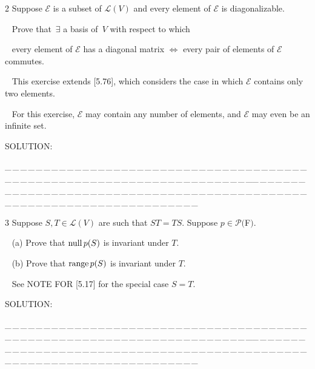 \documentclass[a4paper, 11pt, UTF8]{article}
\def\range{\textup{range}\,}
\def\null{\textup{null\,}}
\def\Lm{\mathcal{L}}
\def\Po{\mathcal{P}}
\begin{document}
\begin{large}
{\timesbf\Large 2} {\timessl\Large 
Suppose $\mathcal{E}$ is a subset of $\Lm(V)$ and every element of $\mathcal{E}$ is diagonalizable.}\par\,\,\,
{\timessl\Large
Prove that $\,\exists$ a basis of \,$V$ with respect to which}\par\,\,\,
{\timessl\Large every element of $\mathcal{E}$ has a diagonal matrix $\Longleftrightarrow$ every pair of elements of $\mathcal{E}$ commutes.
}\par\,\,\,
{\timessl\small
This exercise extends [5.76], which considers the case in which $\mathcal{E}$ contains only two elements.}\par\,\,\,
{\timessl\small For this exercise, $\mathcal{E}$ may contain any number of elements,
and $\mathcal{E}$ may even be an infinite set.
}\par
{\timesbf S\footnotesize{OLUTION:}}\par\quad

\par
{\tiny \_\,\_\,\_\,\_\,\_\,\_\,\_\,\_\,\_\,\_\,\_\,\_\,\_\,\_\,\_\,\_\,\_\,\_\,\_\,\_\,\_\,\_\,\_\,\_\,\_\,\_\,\_\,\_\,\_\,\_\,\_\,\_\,\_\,\_\,\_\,\_\,\_\,\_\,\_\,\_\,\_\,\_\,\_\,\_\,\_\,\_\,\_\,\_\,\_\,\_\,\_\,\_\,\_\,\_\,\_\,\_\,\_\,\_\,\_\,\_\,\_\,\_\,\_\,\_\,\_\,\_\,\_\,\_\,\_\,\_\,\_\_\,\_\,\_\,\_\,\_\,\_\,\_\,\_\,\_\,\_\,\_\,\_\,\_\,\_\,\_\,\_\,\_\,\_\,\_\,\_\,\_\,\_\,\_\,\_\,\_\,\_\,\_\,\_\,\_\,\_\,\_\,\_\,\_\,\_\,\_\,\_\,\_\,\_\,\_\,\_\,\_\,\_\,\_\,\_\,\_\,\_\,\_\,\_\,\_\,\_\,\_\,\_\,\_\,\_\,\_\,\_\,\_\,\_\,\_\,\_\,\_\,\_\,\_\,\_\,\_\,\_\,\_\,\_\,\_\,\_\,\_}\par

{\timesbf\Large 3} {\timessl\Large 
Suppose $S, T\in\Lm(V)$ are such that $ST = TS$. Suppose $p\in\Po(${\timesbf F}$)$.
}\par\,\,\,
(a) {\timessl\Large
Prove that $\null p(S)$ is invariant under $T$.
}\par\,\,\,
(b) {\timessl\Large
Prove that $\range p(S)$ is invariant under $T$.
}\par\,\,\,
{\timessl\Large See N{\normalsize OTE} F{\normalsize OR} [5.17] for the special case $S = T$.}\par
{\timesbf S\footnotesize{OLUTION:}}\par\quad

\par
{\tiny \_\,\_\,\_\,\_\,\_\,\_\,\_\,\_\,\_\,\_\,\_\,\_\,\_\,\_\,\_\,\_\,\_\,\_\,\_\,\_\,\_\,\_\,\_\,\_\,\_\,\_\,\_\,\_\,\_\,\_\,\_\,\_\,\_\,\_\,\_\,\_\,\_\,\_\,\_\,\_\,\_\,\_\,\_\,\_\,\_\,\_\,\_\,\_\,\_\,\_\,\_\,\_\,\_\,\_\,\_\,\_\,\_\,\_\,\_\,\_\,\_\,\_\,\_\,\_\,\_\,\_\,\_\,\_\,\_\,\_\,\_\_\,\_\,\_\,\_\,\_\,\_\,\_\,\_\,\_\,\_\,\_\,\_\,\_\,\_\,\_\,\_\,\_\,\_\,\_\,\_\,\_\,\_\,\_\,\_\,\_\,\_\,\_\,\_\,\_\,\_\,\_\,\_\,\_\,\_\,\_\,\_\,\_\,\_\,\_\,\_\,\_\,\_\,\_\,\_\,\_\,\_\,\_\,\_\,\_\,\_\,\_\,\_\,\_\,\_\,\_\,\_\,\_\,\_\,\_\,\_\,\_\,\_\,\_\,\_\,\_\,\_\,\_\,\_\,\_\,\_\,\_}\par


\end{large}
\end{document}
